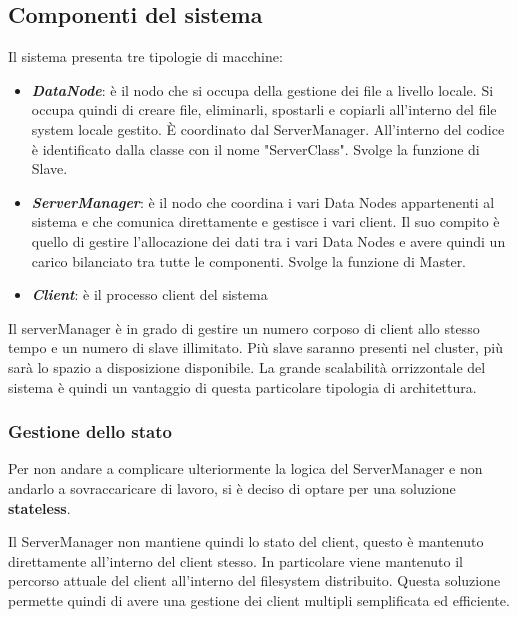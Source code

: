 \documentclass[]{article}
\begin{document}
\subsection{Componenti del sistema}

Il sistema presenta tre tipologie di macchine:

\begin{itemize}
		\item \textit{\textbf{DataNode}}: è il nodo che si occupa della gestione dei file a livello locale. Si occupa quindi di creare file, eliminarli, spostarli e copiarli all'interno del file system locale gestito. È coordinato dal ServerManager. All'interno del codice è identificato dalla classe con il nome "ServerClass". Svolge la funzione di Slave.
		\item \textit{\textbf{ServerManager}}: è il nodo che coordina i vari Data Nodes appartenenti al sistema e che comunica direttamente e gestisce i vari client. Il suo compito è quello di gestire l'allocazione dei dati tra i vari Data Nodes e avere quindi un carico bilanciato tra tutte le componenti. Svolge la funzione di Master.
		\item \textit{\textbf{Client}}: è il processo client del sistema
		
\end{itemize}

Il serverManager è in grado di gestire un numero corposo di client allo stesso tempo e un numero di slave illimitato. Più slave saranno presenti nel cluster, più sarà lo spazio a disposizione disponibile. La grande scalabilità orrizzontale del sistema è quindi un vantaggio di questa particolare tipologia di architettura.

\subsubsection{Gestione dello stato}

Per non andare a complicare ulteriormente la logica del ServerManager e non andarlo a sovraccaricare di lavoro, si è deciso di optare per una soluzione \textbf{stateless}.
\vspace{0.2cm}

 Il ServerManager non mantiene quindi lo stato del client, questo è
 mantenuto direttamente all'interno del client stesso. In particolare viene mantenuto il percorso attuale del client all'interno del filesystem distribuito. Questa soluzione permette quindi di avere una gestione dei client multipli semplificata ed efficiente. 
\end{document}
